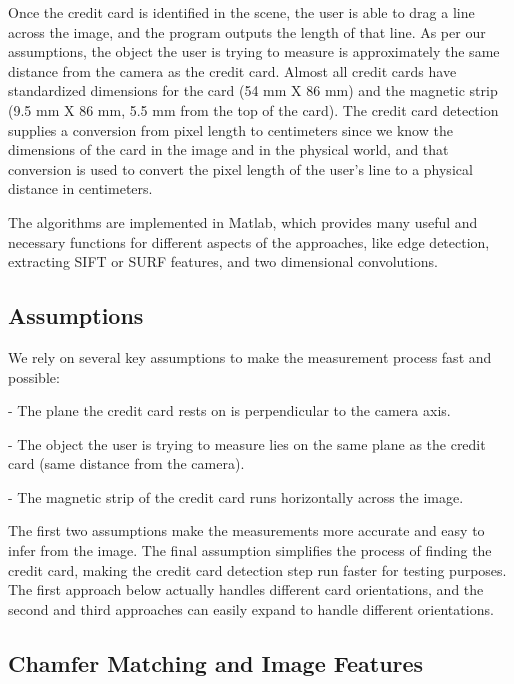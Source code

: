 \documentclass[10pt,twocolumn,letterpaper]{article}
\begin{document}
Once the credit card is identified in the scene, the user is able to drag a line across the image, and the program outputs the length of that line. As per our assumptions, the object the user is trying to measure is approximately the same distance from the camera as the credit card. Almost all credit cards have standardized dimensions for the card (54 mm X 86 mm) and the magnetic strip (9.5 mm X 86 mm, 5.5 mm from the top of the card). The credit card detection supplies a conversion from pixel length to centimeters since we know the dimensions of the card in the image and in the physical world, and that conversion is used to convert the pixel length of the user’s line to a physical distance in centimeters. 

	The algorithms are implemented in Matlab, which provides many useful and necessary functions for different aspects of the approaches, like edge detection, extracting SIFT or SURF features, and two dimensional convolutions.  

\subsection{Assumptions}

	We rely on several key assumptions to make the measurement process fast and possible:


- The plane the credit card rests on is perpendicular to the camera axis.

- The object the user is trying to measure lies on the same plane as the credit card (same distance from the camera). 

- The magnetic strip of the credit card runs horizontally across the image.


The first two assumptions make the measurements more accurate and easy to infer from the image. The final assumption simplifies the process of finding the credit card, making the credit card detection step run faster for testing purposes. The first approach below actually handles different card orientations, and the second and third approaches can easily expand to handle different orientations. 

\subsection{Chamfer Matching and Image Features}
\end{document}
